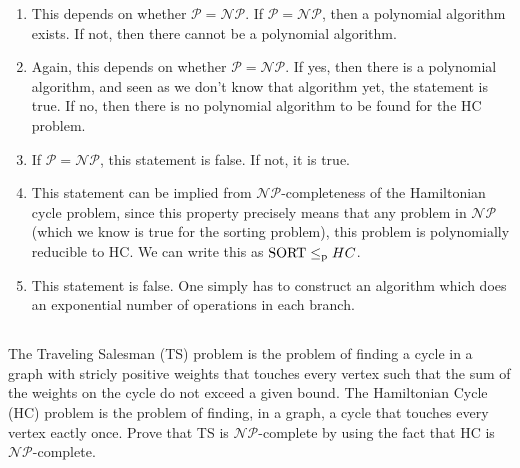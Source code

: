 \begin{solution}
\begin{enumerate}
	\item This depends on whether \(\mathcal{P} = \mathcal{NP}\).
	If \(\mathcal{P} = \mathcal{NP}\), then a polynomial algorithm exists.
	If not, then there cannot be a polynomial algorithm.
	\item Again, this depends on whether \(\mathcal{P} = \mathcal{NP}\).
	If yes, then there is a polynomial algorithm,
	and seen as we don't know that algorithm yet, the statement is true.
	If no, then there is no polynomial algorithm
	to be found for the HC problem.
	\item If \(\mathcal{P} = \mathcal{NP}\), this statement is false.
	If not, it is true.
	\item This statement can be implied from \(\mathcal{NP}\)-completeness
	of the Hamiltonian cycle problem,
	since this property precisely means that any problem in \(\mathcal{NP}\)
	(which we know is true for the sorting problem),
	this problem is polynomially reducible to HC.
	We can write this as \(\mathrm{SORT} \le_\textnormal{p} HC\).
	\item This statement is false.
	One simply has to construct an algorithm
	which does an exponential number of operations in each branch.
\end{enumerate}
\end{solution}

\subsection{} %
The Traveling Salesman (TS) problem is the problem of finding a cycle
in a graph with stricly positive weights that touches every vertex
such that the sum of the weights on the cycle do not exceed a given bound.
The Hamiltonian Cycle (HC) problem is the problem of finding,
in a graph, a cycle that touches every vertex eactly once.
Prove that TS is \(\mathcal{NP}\)-complete by using the fact
that HC is \(\mathcal{NP}\)-complete.

